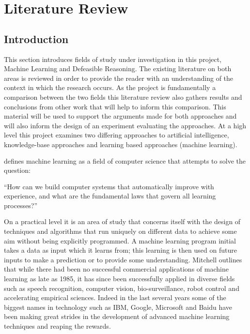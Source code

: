 
\chapter{Literature Review} 

\label{Chapter2} 


\section{Introduction}

This section introduces fields of study under investigation in this project, Machine Learning and Defeasible Reasoning. The existing literature on both areas is reviewed in order to provide the reader with an understanding of the context in which the research occurs. As the project is fundamentally a comparison between the two fields this literature review also gathers results and conclusions from other work that will help to inform this comparison. This material will be used to support the arguments made for both approaches and will also inform the design of an experiment evaluating the approaches. At a high level this project examines two differing approaches to artificial intelligence, knowledge-base approaches and learning based approaches (machine learning).

\cite{mitchell2006discipline} defines machine learning as a field of computer science that attempts to solve the question:

``How can we build computer systems that automatically improve with experience, and what are the fundamental laws that govern all learning processes?''

On a practical level it is an area of study that concerns itself with the design of techniques and algorithms that run uniquely on different data to achieve some aim without being explicitly programmed. A machine learning program initial takes a data as input which it learns from; this learning is then used on future inputs to make a prediction or to provide some understanding. Mitchell outlines that while there had been no successful commercial applications of machine learning as late as 1985, it has since been successfully applied in diverse fields such as speech recognition, computer vision, bio-surveillance, robot control and accelerating empirical sciences. Indeed in the last several years some of the biggest names in technology such as IBM, Google, Microsoft and Baidu have been making great strides in the development of advanced machine learning techniques and reaping the rewards.

